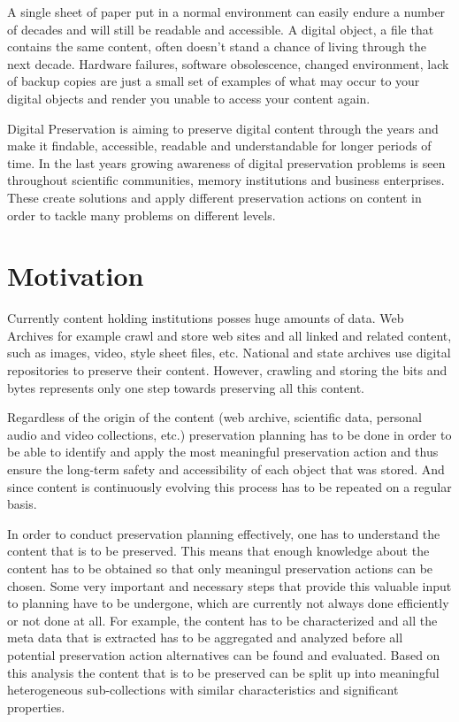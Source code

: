 A single sheet of paper put in a normal environment can easily endure a number of decades and will still be readable and accessible. A digital object, a file that contains the same content, often doesn't stand a chance of living through the next decade. Hardware failures, software obsolescence, changed environment, lack of backup copies are just a small set of examples of what may occur to your digital objects and render you unable to access your content again.

Digital Preservation is aiming to preserve digital content through the years and make it findable, accessible, readable and understandable for longer periods of time. In the last years growing awareness of digital preservation problems is seen throughout scientific communities, memory institutions and business enterprises. These create solutions and apply different preservation actions on content in order to tackle many problems on different levels.

\section{Motivation}
Currently content holding institutions posses huge amounts of data. Web Archives for example crawl and store web sites and all linked and related content, such as images, video, style sheet files, etc. National and state archives use digital repositories to preserve their content. However, crawling and storing the bits and bytes represents only one step towards preserving all this content. 

Regardless of the origin of the content (web archive, scientific data, personal audio and video collections, etc.) preservation planning has to be done in order to be able to identify and apply the most meaningful preservation action and thus ensure the long-term safety and accessibility of each object that was stored. And since content is continuously evolving this process has to be repeated on a regular basis.

In order to conduct preservation planning effectively, one has to understand the content that is to be preserved. This means that enough knowledge about the content has to be obtained so that only meaningul preservation actions can be chosen.
Some very important and necessary steps that provide this valuable input to planning have to be undergone, which are currently not always done efficiently or not done at all.
For example, the content has to be characterized and all the meta data that is extracted has to be aggregated and analyzed before all potential preservation action alternatives can be found and evaluated. Based on this analysis the content that is to be preserved can be split up into meaningful heterogeneous sub-collections with similar characteristics and significant properties.

